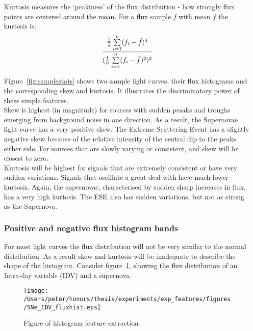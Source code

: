 	Kurtosis measures the `peakiness' of the flux distribution - how strongly flux points are centered around the mean. For a flux sample $f$ with mean $\bar{f}$ the kurtosis is:
	\begin{equation}
		\frac{\frac{1}{n}\sum\limits^{n}_{i=1}(f_{i} - \bar{f})^{4}}
		{(\frac{1}{n}\sum\limits^{n}_{i=1}(f_{i} - \bar{f})^{2})^{2}} \\
	\end{equation}
	
	Figure~\ref{fig:samplestats} shows two sample light curves, their flux histograms and the corresponding skew and kurtosis.  It illustrates the discriminatory power of these simple features. \\
	
	Skew is highest (in magnitude) for sources with sudden pesaks and troughs emerging from background noise in one direction. As a result, the Supernovae light curve has a very positive skew. The Extreme Scattering Event has a slightly negative skew because of the relative intensity of the central dip to the peaks either side. For sources that are slowly varying or consistent, and skew will be closest to zero. \\
	
	Kurtosis will be highest for signals that are extremely consistent or have very sudden variations. Signals that oscillate a great deal with have much lower kurtosis. Again, the supernovae, characterised by sudden sharp increases in flux, has a very high kurtosis. The ESE also has sudden variations, but not as strong as the Supernova. \\
	
		
	\subsubsection{Positive and negative flux histogram bands}
		For most light curves the flux distribution will not be very similar to the normal distribution. As a result skew and kurtosis will be inadequate to describe the shape of the histogram. Consider figure~\ref{fig:histograms}, showing the flux distribution of an Intra-day variable (IDV) and a supernova.  \\
	
	\begin{figure}[ht!]
		\centering
		\label{fig:histograms}
		\texttt{[image: /Users/peter/honors/thesis/experiments/exp\_features/figures/SNe\_IDV\_fluxhist.eps]}
		\caption{Figure of histogram feature extraction}
	\end{figure}
	
